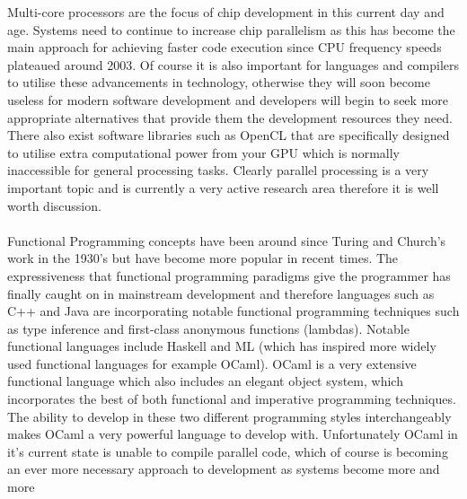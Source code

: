 \documentclass[12pt,twoside,notitlepage]{report}
\begin{document}
%
%
%
Multi-core processors are the focus of chip development in this current day and age. Systems need to continue to increase chip parallelism as this has become the main approach for achieving faster code execution since CPU frequency
speeds plateaued around 2003\cite{hennessy2012}. Of course it is also important for languages and compilers to utilise these advancements in technology, otherwise they will soon become useless for modern software development and
developers will begin to seek more appropriate alternatives that provide them the development resources they need. There also exist software libraries such as OpenCL that are specifically designed to utilise extra computational power
from your GPU which is normally inaccessible for general processing tasks. Clearly parallel processing is a very important topic and is currently a very active research area therefore it is well worth discussion.
\hfill\\
\hfill\\
%
%
Functional Programming concepts have been around since Turing and Church's work in the 1930's\cite{scott2009} but have become more popular in recent times. The expressiveness that functional programming paradigms give the programmer
has finally caught on in mainstream development and therefore languages such as C++ and Java are incorporating notable functional programming techniques such as type inference\cite{web:autokeyword} and first-class anonymous functions
(lambdas)\cite{web:javalambda}. Notable functional languages include Haskell and ML (which has inspired more widely used functional languages for example OCaml\cite{madhavapeddy2013}). OCaml is a very extensive functional language
which also includes an elegant object system, which incorporates the best of both functional and imperative programming techniques. The ability to develop in these two different programming styles interchangeably makes OCaml a very
powerful language to develop with. Unfortunately OCaml in it's current state is unable to compile parallel code, which of course is becoming an ever more necessary approach to development as systems become more and more
\end{document}
